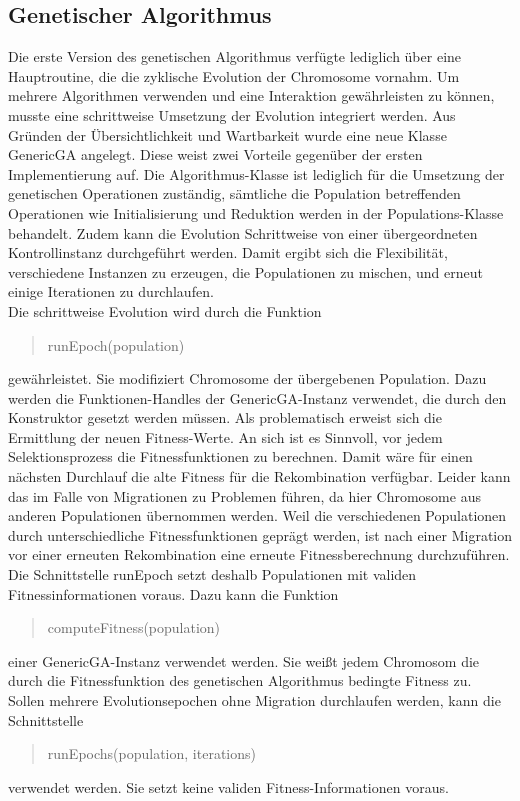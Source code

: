 \documentclass[12pt,a4paper]{article}
\begin{document}
\subsection{Genetischer Algorithmus}
Die erste Version des genetischen Algorithmus verfügte lediglich über eine Hauptroutine, die die zyklische Evolution der Chromosome vornahm. Um mehrere Algorithmen verwenden und eine Interaktion gewährleisten zu können, musste eine schrittweise Umsetzung der Evolution integriert werden. Aus Gründen der Übersichtlichkeit und Wartbarkeit wurde eine neue Klasse \textsf{GenericGA} angelegt. Diese weist zwei Vorteile gegenüber der ersten Implementierung auf. Die Algorithmus-Klasse ist lediglich für die Umsetzung der genetischen Operationen zuständig, sämtliche die Population betreffenden Operationen wie Initialisierung und Reduktion werden in der Populations-Klasse behandelt. Zudem kann die Evolution Schrittweise von einer übergeordneten Kontrollinstanz durchgeführt werden. Damit ergibt sich die Flexibilität, verschiedene Instanzen zu erzeugen, die Populationen zu mischen, und erneut einige Iterationen zu durchlaufen. \\
Die schrittweise Evolution wird durch die Funktion \begin{quote}
\textsf{runEpoch(population)}
\end{quote} gewährleistet. Sie modifiziert Chromosome der übergebenen Population. Dazu werden die Funktionen-Handles der \textsf{GenericGA}-Instanz verwendet, die durch den Konstruktor gesetzt werden müssen. Als problematisch erweist sich die Ermittlung der neuen Fitness-Werte. An sich ist es Sinnvoll, vor jedem Selektionsprozess die Fitnessfunktionen zu berechnen. Damit wäre für einen nächsten Durchlauf die alte Fitness für die Rekombination verfügbar. Leider kann das im Falle von Migrationen zu Problemen führen, da hier Chromosome aus anderen Populationen übernommen werden. Weil die verschiedenen Populationen durch unterschiedliche Fitnessfunktionen geprägt werden, ist nach einer Migration vor einer erneuten Rekombination eine erneute Fitnessberechnung durchzuführen. Die Schnittstelle \textsf{runEpoch} setzt deshalb Populationen mit validen Fitnessinformationen voraus. Dazu kann die Funktion \begin{quote}
\textsf{computeFitness(population)} \end{quote} einer \textsf{GenericGA}-Instanz verwendet werden. Sie weißt jedem Chromosom die durch die Fitnessfunktion des genetischen Algorithmus bedingte Fitness zu. Sollen mehrere Evolutionsepochen ohne Migration durchlaufen werden, kann die Schnittstelle 
\begin{quote}
\textsf{runEpochs(population, iterations)}
\end{quote} verwendet werden. Sie setzt keine validen Fitness-Informationen voraus.
\end{document}

